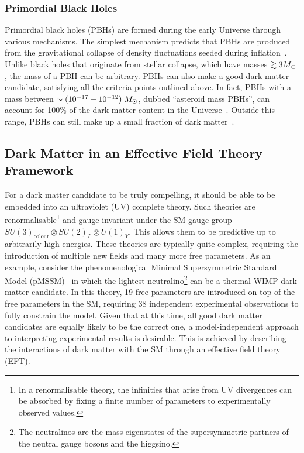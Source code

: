 \subsubsection*{Primordial Black Holes}

Primordial black holes (PBHs) are formed during the early Universe through various mechanisms. The simplest mechanism predicts that PBHs are produced from the gravitational collapse of density fluctuations seeded during inflation~\cite{Hawking:1971ei_apr_Gravitationallycollapsedobjects, Carr:1974nx_Blackholesearly,Carr:1975qj_Primordialblackhole}. 
Unlike black holes that originate from stellar collapse, which have masses $\gtrsim 3M_\odot$, the mass of a PBH can be arbitrary.  PBHs can also make a good dark matter candidate, satisfying all the criteria points outlined above. In fact, PBHs with a mass between $\sim (10^{-17} - 10^{-12})\;M_\odot$, dubbed ``asteroid mass PBHs'', can account for 100\% of the dark matter content in the Universe~\cite{Montero-Camacho:2019jte_aug_Revisitingconstraintsasteroidmass}. Outside this range, PBHs can still make up a small fraction of dark matter~\cite{Villanueva-Domingo:2021spv_may_Briefreviewprimordial}. 

\subsection{Dark Matter in an Effective Field Theory Framework}
\label{ch1:subsec:DM_EFTs}

For a dark matter candidate to be truly compelling, it should be able to be embedded into an ultraviolet (UV) complete theory. Such theories are renormalisable\footnote{In a renormalisable theory, the infinities that arise from UV divergences can be absorbed by fixing a finite number of parameters to experimentally observed values.} and gauge invariant under the SM gauge group $SU(3)_\mathrm{colour}\otimes SU(2)_L\otimes U(1)_Y$. This allows them to be predictive up to arbitrarily high energies. These theories are typically quite complex, requiring the introduction of multiple new fields and many more free parameters. As an example, consider the phenomenological Minimal Supersymmetric Standard Model (pMSSM)~\cite{Villanueva-Domingo:2021spv_may_Briefreviewprimordial} in which the lightest neutralino\footnote{The neutralinos are the mass eigenstates of the supersymmetric partners of the neutral gauge bosons and the higgsino.} can be a thermal WIMP dark matter candidate. In this theory, 19 free parameters are introduced on top of the free parameters in the SM, requiring 38 independent experimental observations to fully constrain the model. Given that at this time, all good dark matter candidates are equally likely to be the correct one, a model-independent approach to interpreting experimental results is desirable. This is achieved by describing the interactions of dark matter with the SM through an effective field theory (EFT).

